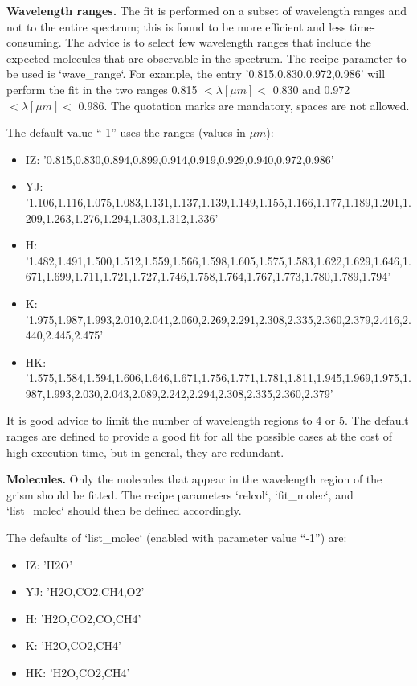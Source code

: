 \textbf{Wavelength ranges.} The fit is performed on a subset of wavelength ranges and not to the entire spectrum;
this is found to be more efficient and less time-consuming. The advice is to select few wavelength ranges
that include the expected molecules that are observable in the spectrum. The recipe parameter to be used
is `wave\_range`. For example, the entry ’0.815,0.830,0.972,0.986’ will perform the fit in the two ranges
0.815 $< \lambda[\mu m] <$ 0.830 and 0.972 $< \lambda[\mu m] <$ 0.986. The quotation marks are mandatory, spaces are not allowed.

The default value ``-1'' uses the ranges (values in $\mu m$):
\begin{itemize}
\item IZ: ’0.815,0.830,0.894,0.899,0.914,0.919,0.929,0.940,0.972,0.986’
\item YJ: ’1.106,1.116,1.075,1.083,1.131,1.137,1.139,1.149,1.155,1.166,1.177,1.189,1.201,1.209,1.263,1.276,1.294,1.303,1.312,1.336’
\item H: ’1.482,1.491,1.500,1.512,1.559,1.566,1.598,1.605,1.575,1.583,1.622,1.629,1.646,1.671,1.699,1.711,1.721,1.727,1.746,1.758,1.764,1.767,1.773,1.780,1.789,1.794’
\item K: ’1.975,1.987,1.993,2.010,2.041,2.060,2.269,2.291,2.308,2.335,2.360,2.379,2.416,2.440,2.445,2.475’
\item HK: ’1.575,1.584,1.594,1.606,1.646,1.671,1.756,1.771,1.781,1.811,1.945,1.969,1.975,1.987,1.993,2.030,2.043,2.089,2.242,2.294,2.308,2.335,2.360,2.379’
\end{itemize}

It is good advice to limit the number of wavelength regions to 4 or 5. The default ranges are defined
to provide a good fit for all the possible cases at the cost of high execution time, but in general, they
are redundant.

\textbf{Molecules.} Only the molecules that appear in the wavelength region of the grism should
be fitted. The recipe parameters `relcol`, `fit\_molec`, and `list\_molec` should then be defined
accordingly.

The defaults of `list\_molec` (enabled with parameter value ``-1'') are:
\begin{itemize}
\item IZ: ’H2O’
\item YJ: ’H2O,CO2,CH4,O2’
\item H: ’H2O,CO2,CO,CH4’
\item K: ’H2O,CO2,CH4’
\item HK: ’H2O,CO2,CH4’
\end{itemize}

